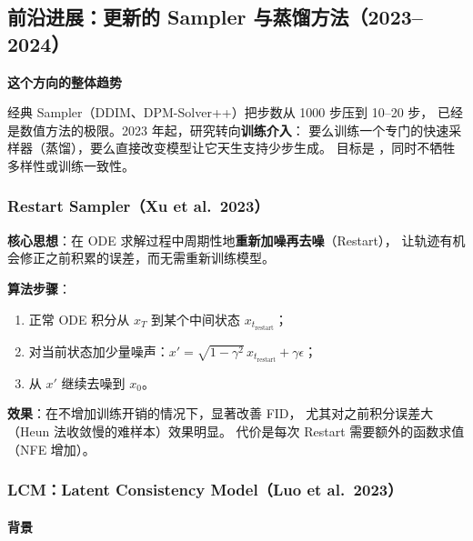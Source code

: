 \subsection{前沿进展：更新的 Sampler 与蒸馏方法（2023--2024）}

\begin{intubox}
\textbf{这个方向的整体趋势}

经典 Sampler（DDIM、DPM-Solver++）把步数从 1000 步压到 10--20 步，
已经是数值方法的极限。2023 年起，研究转向\textbf{训练介入}：
要么训练一个专门的快速采样器（蒸馏），要么直接改变模型让它天生支持少步生成。
目标是 ，同时不牺牲多样性或训练一致性。
\end{intubox}

\subsubsection{Restart Sampler（Xu et al.\ 2023）}

\begin{conceptbox}
\textbf{核心思想}：在 ODE 求解过程中周期性地\textbf{重新加噪再去噪}（Restart），
让轨迹有机会修正之前积累的误差，而无需重新训练模型。

\textbf{算法步骤}：
\begin{enumerate}
  \item 正常 ODE 积分从 $x_T$ 到某个中间状态 $x_{t_\text{restart}}$；
  \item 对当前状态加少量噪声：$x' = \sqrt{1-\gamma^2}\,x_{t_\text{restart}} + \gamma\epsilon$；
  \item 从 $x'$ 继续去噪到 $x_0$。
\end{enumerate}

\textbf{效果}：在不增加训练开销的情况下，显著改善 FID，
尤其对之前积分误差大（Heun 法收敛慢的难样本）效果明显。
代价是每次 Restart 需要额外的函数求值（NFE 增加）。
\end{conceptbox}

\subsubsection{LCM：Latent Consistency Model（Luo et al.\ 2023）}

\paragraph{背景}


